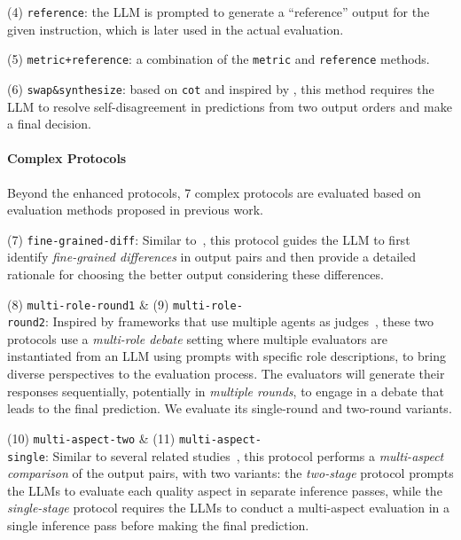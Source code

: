 \documentclass[11pt]{article}
\begin{document}
\noindent (4) \texttt{reference}: the LLM is prompted to generate a ``reference'' output for the given instruction, which is later used in the actual evaluation.
% 

\noindent (5) \texttt{metric+reference}: a combination of the \texttt{metric} and \texttt{reference} methods.
% 

\noindent (6) \texttt{swap\&synthesize}: based on \texttt{cot} and inspired by \citet{du2024improving}, this method requires the LLM to resolve self-disagreement in predictions from two output orders and make a final decision.
% 

\paragraph{Complex Protocols}
Beyond the enhanced protocols, 7 complex protocols are evaluated based on evaluation methods proposed in previous work.

\noindent (7) \texttt{fine-grained-diff}: Similar to~\citet{min-etal-2023-factscore}, this protocol guides the LLM to first identify \textit{fine-grained differences} in output pairs and then provide a detailed rationale for choosing the better output considering these differences.
% 

\noindent (8) \texttt{multi-role-round1} \& (9) \texttt{multi-role-\\round2}: 
Inspired by frameworks that use multiple agents as judges~\citep{li2023prd, chan2024chateval, zhao2024autoarena}, these two protocols use a \textit{multi-role debate} setting where multiple evaluators are instantiated from an LLM using prompts with specific role descriptions, to bring diverse perspectives to the evaluation process.
The evaluators will generate their responses sequentially, potentially in \textit{multiple rounds}, to engage in a debate that leads to the final prediction.  
We evaluate its single-round and two-round variants. 
% 

\noindent (10) \texttt{multi-aspect-two} \& (11) \texttt{multi-aspect-\\single}: Similar to several related studies~\citep{saha2023branchsolvemerge, gong2023coascore, li2023generative, li2024decompose}, this protocol performs a \textit{multi-aspect comparison} of the output pairs, with two variants:
the \textit{two-stage} protocol prompts the LLMs to evaluate each quality aspect in separate inference passes, while the \textit{single-stage} protocol requires the LLMs to conduct a multi-aspect evaluation in a single inference pass before making the final prediction.
% 
\end{document}

